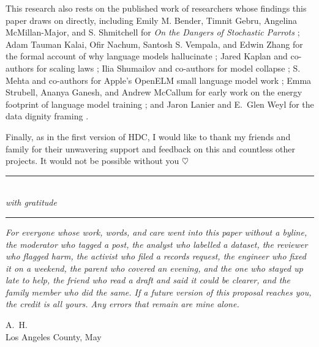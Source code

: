 \documentclass[10pt,a4paper,twocolumn]{article}
\begin{document}
This research also rests on the published work of researchers whose findings this paper draws on directly, including Emily M. Bender, Timnit Gebru, Angelina McMillan-Major, and S. Shmitchell for \emph{On the Dangers of Stochastic Parrots} \citep{bender2021parrots}; Adam Tauman Kalai, Ofir Nachum, Santosh S. Vempala, and Edwin Zhang for the formal account of why language models hallucinate \citep{kalai2025whyhallucinate}; Jared Kaplan and co-authors for scaling laws \citep{kaplan2020scaling}; Ilia Shumailov and co-authors for model collapse \citep{shumailov2024modelcollapse}; S. Mehta and co-authors for Apple's OpenELM small language model work \citep{openelm2024}; Emma Strubell, Ananya Ganesh, and Andrew McCallum for early work on the energy footprint of language model training \citep{strubell2019energy}; and Jaron Lanier and E.~Glen Weyl for the data dignity framing \citep{lanier2018dignity}.

Finally, as in the first version of HDC, I would like to thank my friends and family for their unwavering support and feedback on this and countless other projects. It would not be possible without you $\heartsuit$

\vspace{1.5em}

\begin{center}
\rule{0.3\textwidth}{0.4pt}\\[6pt]
{\itshape with gratitude}\\[6pt]
\rule{0.3\textwidth}{0.4pt}
\end{center}

\vspace{1.5em}

\begin{center}
\begin{minipage}{0.78\textwidth}
\small\itshape\noindent
For everyone whose work, words, and care went into this paper without a byline, the moderator who tagged a post, the analyst who labelled a dataset, the reviewer who flagged harm, the activist who filed a records request, the engineer who fixed it on a weekend, the parent who covered an evening, and the one who stayed up late to help, the friend who read a draft and said it could be clearer, and the family member who did the same. If a future version of this proposal reaches you, the credit is all yours. Any errors that remain are mine alone.

\medskip
\centering
\upshape
A.~H. \\
Los Angeles County, May \the\year
\vspace{1.5em}
\end{minipage}
\end{center}
\end{document}
